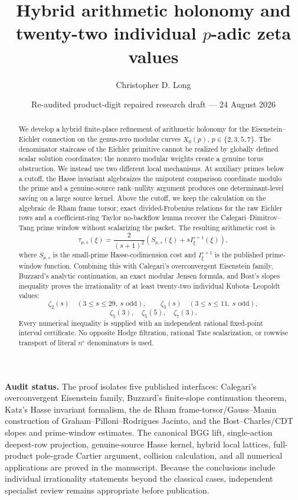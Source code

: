\documentclass[11pt]{article}
\title{Hybrid arithmetic holonomy and\\
twenty-two individual $p$-adic zeta values}
\author{Christopher D. Long}
\date{Re-audited product-digit repaired research draft --- 24 August 2026}
\theoremstyle{definition}
\theoremstyle{remark}
\begin{document}
\maketitle

\begin{abstract}
We develop a hybrid finite-place refinement of arithmetic holonomy for the
Eisenstein--Eichler connection on the genus-zero modular curves
$X_0(p)$, $p\in\{2,3,5,7\}$.  The denominator staircase of the Eichler
primitive cannot be realized by globally defined scalar solution coordinates:
the nonzero modular weights create a genuine torus obstruction.  We instead
use two different local mechanisms.  At auxiliary primes below a cutoff, the
Hasse invariant algebraizes the unipotent comparison coordinate modulo the
prime and a genuine-source rank--nullity argument produces one
determinant-level saving on a large source kernel.  Above the cutoff, we keep the calculation on the algebraic de Rham
frame torsor; exact divided-Frobenius relations for the raw Eichler rows and a
coefficient-ring Taylor no-backflow lemma recover the Calegari--Dimitrov--Tang
prime window without scalarizing the packet.  The resulting arithmetic cost is
\[
 \tau_{p,s}(\xi)=\frac{2}{(s+1)^2}
 \left(S_{p,s}(\xi)+s I^{s+1}_{\xi}(\xi)\right),
\]
where $S_{p,s}$ is the small-prime Hasse-codimension cost and
$I^{s+1}_{\xi}$ is the published prime-window function.  Combining this with
Calegari's overconvergent Eisenstein family, Buzzard's analytic continuation,
an exact modular Jensen formula, and Bost's slopes inequality proves the
irrationality of at least twenty-two individual Kubota--Leopoldt values:
\[
 \zeta_2(s)\quad(3\le s\le29,\ s\text{ odd}),\qquad
 \zeta_3(s)\quad(3\le s\le11,\ s\text{ odd}),
\]
\[
 \zeta_5(3),\quad \zeta_5(5),\quad \zeta_7(3).
\]
Every numerical inequality is supplied with an independent rational
fixed-point interval certificate.  No opposite Hodge filtration, rational Tate
scalarization, or rowwise transport of literal $n^e$ denominators is used.
\end{abstract}

\medskip
\noindent\textbf{Audit status.}
The proof isolates five published interfaces: Calegari's overconvergent
Eisenstein family, Buzzard's finite-slope continuation theorem, Katz's Hasse
invariant formalism, the de Rham frame-torsor/Gauss--Manin construction of
Graham--Pilloni--Rodrigues Jacinto, and the Bost--Charles/CDT slopes and
prime-window estimates.  The canonical BGG lift, single-action deepest-row
projection, genuine-source Hasse kernel, hybrid local lattices, full-product
pole-grade Cartier argument, collision calculation, and all numerical
applications are proved in the manuscript.  Because the conclusions include
individual irrationality statements beyond the classical cases, independent
specialist review remains appropriate before publication.
\end{document}
